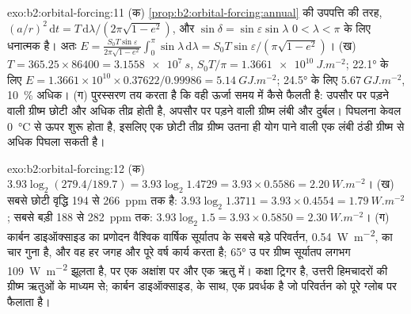 \begin{solution}{exo:b2:orbital-forcing:11}
(क) \cref{prop:b2:orbital-forcing:annual} की उपपत्ति की तरह, $(a/r)^2\,\mathrm dt =
T\,\mathrm d\lambda/(2\pi\sqrt{1 - e^2})$, और $\sin\delta = \sin\varepsilon\sin\lambda$
$0 < \lambda < \pi$ के लिए धनात्मक है। अतः $E = \frac{S_0T\sin\varepsilon}{2\pi\sqrt{1 - e^2}}\int_0^{\pi}\sin\lambda
\,\mathrm d\lambda = S_0T\sin\varepsilon/(\pi\sqrt{1 - e^2})$। (ख) $T = 365.25 \times 86400 =
\qty{3.1558e7}{s}$, $S_0T/\pi = \qty{1.3661e10}{J.m^{-2}}$; \ang{22.1} के लिए $E = 1.3661 \times 10^{10}
\times 0.37622/0.99986 = \qty{5.14}{GJ.m^{-2}}$; \ang{24.5} के लिए $\qty{5.67}{GJ.m^{-2}}$,
\qty{10}{\percent} अधिक। (ग) पुरस्सरण तय करता है कि वही ऊर्जा समय में कैसे फैलती है: उपसौर पर पड़ने वाली
ग्रीष्म छोटी और अधिक तीव्र होती है, अपसौर पर पड़ने वाली ग्रीष्म लंबी और दुर्बल। पिघलना
केवल \qty{0}{\celsius} से ऊपर शुरू होता है, इसलिए एक छोटी तीव्र ग्रीष्म उतना ही योग पाने वाली
एक लंबी ठंडी ग्रीष्म से अधिक पिघला सकती है।
\end{solution}

\begin{solution}{exo:b2:orbital-forcing:12}
(क) $3.93\log_2(279.4/189.7) = 3.93\log_2 1.4729 = 3.93 \times 0.5586 = \qty{2.20}{W.m^{-2}}$। (ख)
सबसे छोटी वृद्धि 194 से \qty{266}{ppm} तक है: $3.93\log_2 1.3711 = 3.93 \times 0.4554 =
\qty{1.79}{W.m^{-2}}$; सबसे बड़ी 188 से \qty{282}{ppm} तक: $3.93\log_2 1.5 = 3.93 \times 0.5850 =
\qty{2.30}{W.m^{-2}}$। (ग) कार्बन डाइऑक्साइड का प्रणोदन वैश्विक वार्षिक सूर्यातप के सबसे बड़े
परिवर्तन, \qty{0.54}{W.m^{-2}}, का चार गुना है, और वह हर जगह और पूरे वर्ष कार्य करता है; \ang{65} उ पर ग्रीष्म
सूर्यातप लगभग \qty{109}{W.m^{-2}} झूलता है, पर एक अक्षांश पर और एक ऋतु में।
कक्षा ट्रिगर है, उत्तरी हिमचादरों की ग्रीष्म ऋतुओं के माध्यम से; कार्बन डाइऑक्साइड,
 के साथ, एक प्रवर्धक है जो परिवर्तन को पूरे ग्लोब पर फैलाता है।
\end{solution}

